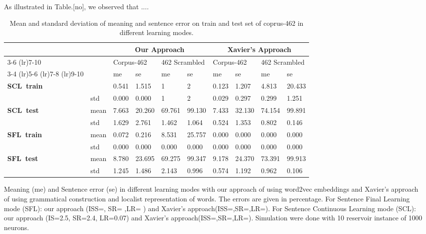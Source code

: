 As illustrated in Table.[no], we observed that ....
\begin{table}
\centering
\begin{threeparttable}
\caption{Mean and standard deviation of meaning and sentence error on train and test set of coprus-462 in different learning modes.}
\label{tab:corpus-structure}
\begin{tabular}{llllllllll}
  \toprule
  &  & \multicolumn{4}{c}{Our Approach} & \multicolumn{4}{c}{Xavier's Approach} \\
  \cmidrule(lr){3-6} \cmidrule(lr){7-10}
  
  \multirow{3}{*}{\raisebox{-\heavyrulewidth}{}} & \multirow{3}{*}{\raisebox{-\heavyrulewidth}{}} & \multicolumn{2}{l}{Corpus-462} & \multicolumn{2}{l}{462 Scrambled} & \multicolumn{2}{l}{Corpus-462} & \multicolumn{2}{l}{462 Scrambled} \\
  \cmidrule(lr){3-4} \cmidrule(lr){5-6} \cmidrule(lr){7-8} \cmidrule(lr){9-10}
  
  						& 		& me & se & me & se	& me & se & me & se \\
  \midrule
  \textbf{SCL\ train} 	& mean 	& 0.541 & 1.515 & 1 & 2 	& 0.123 & 1.207 & 4.813 & 20.433  \\
   			    		& std 	& 0.000 & 0.000 & 1 & 2 	& 0.029 & 0.297 & 0.299 & 1.251  \\
  \textbf{SCL\ test} 	& mean  & 7.663 & 20.260 & 69.761 & 99.130 	& 7.433 & 32.130 & 74.154 & 99.891 \\
  			   			& std  	& 1.629 & 2.761 & 1.462 & 1.064  	& 0.524 & 1.353 & 0.802 & 0.146\\
  \textbf{SFL\ train} 	& mean 	& 0.072 & 0.216 & 8.531 & 25.757 	& 0.000 & 0.000 & 0.000 & 0.000  \\
  				 		& std 	& 0.000 & 0.000 & 0.000 & 0.000 	& 0.000 & 0.000 & 0.000 & 0.000  \\
  \textbf{SFL\ test}	& mean  & 8.780 & 23.695 & 69.275 & 99.347 	& 9.178 & 24.370 & 73.391 & 99.913 \\
  			  			& std 	& 1.245 & 1.486 & 2.143 & 0.996  	& 0.574 & 1.192 & 0.962 & 0.106  \\
  \bottomrule
\end{tabular}
\begin{tablenotes}
\small
\item 
Meaning (me) and Sentence error (se) in different learning modes with our approach of using word2vec embeddings and Xavier's \cite{xavier:2013:RT} approach of using grammatical construction and localist representation of words. The errors are given in percentage. For Sentence Final Learning mode (SFL): our approach (ISS=, SR= ,LR= ) and Xavier's approach(ISS=,SR=,LR=). For Sentence Continuous Learning mode (SCL): our approach (IS=2.5, SR=2.4, LR=0.07) and Xavier's approach(ISS=,SR=,LR=). Simulation were done with 10 reservoir instance of 1000 neurons.
\end{tablenotes}
\end{threeparttable}
\end{table}

